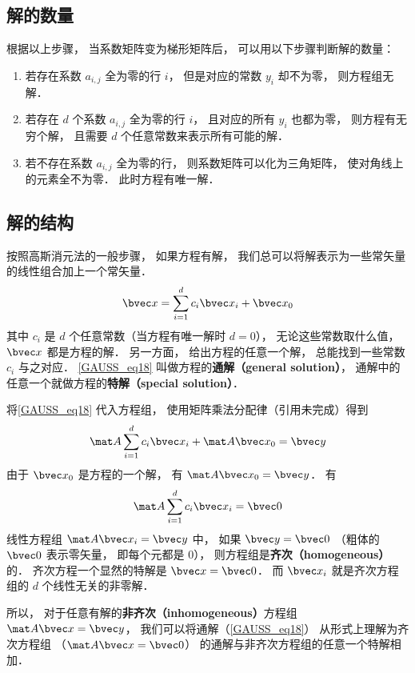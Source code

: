 \subsection{解的数量}
根据以上步骤， 当系数矩阵变为梯形矩阵后， 可以用以下步骤判断解的数量：
\begin{enumerate}
\item 若存在系数 $a_{i,j}$ 全为零的行 $i$， 但是对应的常数 $y_i$ 却不为零， 则方程组无解．
\item 若存在 $d$ 个系数 $a_{i,j}$ 全为零的行 $i$， 且对应的所有 $y_i$ 也都为零， 则方程有无穷个解， 且需要 $d$ 个任意常数来表示所有可能的解．
\item 若不存在系数 $a_{i,j}$ 全为零的行， 则系数矩阵可以化为三角矩阵， 使对角线上的元素全不为零． 此时方程有唯一解．
\end{enumerate}

\subsection{解的结构}
按照高斯消元法的一般步骤， 如果方程有解， 我们总可以将解表示为一些常矢量的线性组合加上一个常矢量．
\begin{equation}\label{GAUSS_eq18}
\bvec x = \sum_{i=1}^{d} c_i \bvec x_i + \bvec x_0
\end{equation}
其中 $c_i$ 是 $d$ 个任意常数（当方程有唯一解时 $d = 0$）， 无论这些常数取什么值， $\bvec x$ 都是方程的解． 另一方面， 给出方程的任意一个解， 总能找到一些常数 $c_i$ 与之对应． \autoref{GAUSS_eq18} 叫做方程的\textbf{通解（general solution）}， 通解中的任意一个就做方程的\textbf{特解（special solution）}．

将\autoref{GAUSS_eq18} 代入方程组， 使用矩阵乘法分配律（引用未完成）得到
\begin{equation}
\mat A \sum_{i=1}^{d} c_i \bvec x_i + \mat A \bvec x_0 = \bvec y
\end{equation}
由于 $\bvec x_0$ 是方程的一个解， 有 $\mat A \bvec x_0 = \bvec y$． 有
\begin{equation}
\mat A \sum_{i=1}^{d} c_i \bvec x_i = \bvec 0
\end{equation}
线性方程组 $\mat A \bvec x_i = \bvec y$ 中， 如果 $\bvec y = \bvec 0$ （粗体的 $\bvec 0$ 表示零矢量， 即每个元都是 0），%
则方程组是\textbf{齐次（homogeneous）}的． 齐次方程一个显然的特解是 $\bvec x = \bvec 0$． 而 $\bvec x_i$ 就是齐次方程组的 $d$ 个线性无关的非零解．

所以， 对于任意有解的\textbf{非齐次（inhomogeneous）}方程组 $\mat A \bvec x = \bvec y$， 我们可以将通解（\autoref{GAUSS_eq18}） 从形式上理解为齐次方程组 （$\mat A \bvec x = \bvec 0$） 的通解与非齐次方程组的任意一个特解相加．
